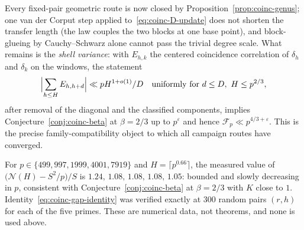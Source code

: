 \begin{remark}
\label{rem:coinc-shell}
Every fixed-pair geometric route is now closed by
Proposition~\ref{prop:coinc-genus}; one van der Corput step applied
to~\eqref{eq:coinc-D-update} does not shorten the transfer length
(the law couples the two blocks at one base point), and block-glueing
by Cauchy--Schwarz alone cannot pass the trivial degree scale.  What
remains is the \emph{shell variance}: with
$E_{h,k}$ the centered coincidence correlation of $\delta_h$ and
$\delta_k$ on the windows, the statement
\[
 \Bigl|\sum_{h\le H}E_{h,h+d}\Bigr|\ll pH^{1+o(1)}/D
 \quad\text{uniformly for }d\le D,\ H\le p^{2/3},
\]
after removal of the diagonal and the classified components, implies
Conjecture~\ref{conj:coinc-beta} at $\beta=2/3$ up to $p^{\varepsilon}$
and hence $\mathcal F_p\ll p^{4/3+\varepsilon}$.  This is the precise
family-compatibility object to which all campaign routes have
converged.
\end{remark}

\begin{remark}\label{rem:coinc-empirical}
For $p\in\{499,997,1999,4001,7919\}$ and $H=\lceil p^{0.66}\rceil$, the
measured value of $\bigl(\mathcal N(H)-S^2/p\bigr)/S$ is
$1.24,\,1.08,\,1.08,\,1.08,\,1.05$: bounded and slowly decreasing in $p$,
consistent with Conjecture~\ref{conj:coinc-beta} at $\beta=2/3$ with
$K$ close to $1$.  Identity~\eqref{eq:coinc-gap-identity} was verified
exactly at $300$ random pairs $(r,h)$ for each of the five primes.  These
are numerical data, not theorems, and none is used above.
\end{remark}

